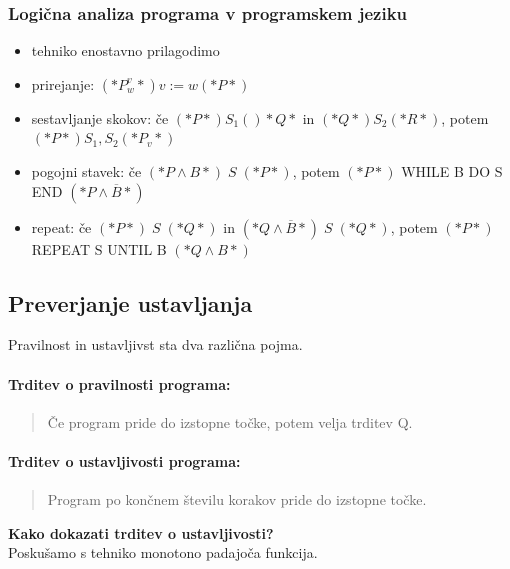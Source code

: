 \documentclass[a4paper,10pt]{article}
\begin{document}
\subsubsection{Logi\v cna analiza programa v programskem jeziku}
\begin{itemize}
\item tehniko enostavno prilagodimo
\item prirejanje: $(\ast P_w^v \ast) v:=w (\ast P \ast)$
\item sestavljanje skokov: \v ce $(\ast P \ast) S_1 ()\ast Q \ast$ in $(\ast Q \ast) S_2 (\ast R \ast)$, potem $(\ast P \ast) S_1,S_2 (\ast P_v \ast)$
\item pogojni stavek: \v ce $(\ast P \wedge B \ast)\;S\;(\ast P \ast)$, potem $(\ast P \ast)$ WHILE B DO S END $(\ast P \wedge \overline{B} \ast)$
\item repeat: \v ce $(\ast P \ast)\; S \;(\ast Q \ast)$ in $(\ast Q \wedge \overline{B} \ast)\;S\;(\ast Q \ast)$, potem $(\ast P \ast)$ REPEAT S UNTIL B $(\ast Q \wedge B\ast)$
\end{itemize}

\subsection{Preverjanje ustavljanja}
Pravilnost in ustavljivst sta dva razli\v cna pojma.

\paragraph{Trditev o pravilnosti programa:}
\begin{quote}
\v Ce program pride do izstopne to\v cke, potem velja trditev Q.
\end{quote}

\paragraph{Trditev o ustavljivosti programa:}
\begin{quote}
Program po kon\v cnem \v stevilu korakov pride do izstopne to\v cke.
\end{quote}
\textbf{Kako dokazati trditev o ustavljivosti?}\\
Posku\v samo s tehniko monotono padajo\v ca funkcija.
\end{document}
